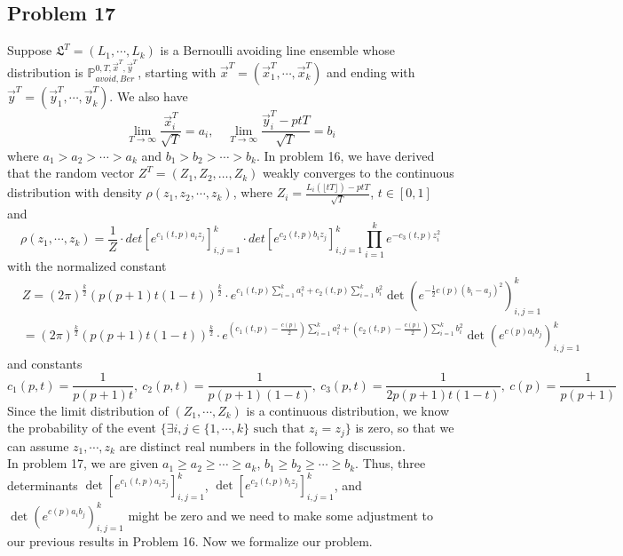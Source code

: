 \documentclass[12pt]{article}
\begin{document}
\subsection*{Problem 17}
Suppose $\mathfrak{L}^{T}=(L_{1},\cdots,L_{k})$ is a Bernoulli avoiding line ensemble whose distribution is $\mathbb{P}_{avoid, Ber}^{0,T,\vec{x}^{T},\vec{y}^{T}}$, starting with $\vec{x}^{T}=(\vec{x}^{T}_{1},\cdots,\vec{x}^{T}_{k})$ and ending with $\vec{y}^{T}=(\vec{y}^{T}_{1},\cdots,\vec{y}^{T}_{k})$. We also have $$\lim_{T\rightarrow\infty}\frac{\vec{x}_{i}^{T}}{\sqrt{T}}=a_{i}, \quad\lim_{T\rightarrow\infty}\frac{\vec{y}_{i}^{T}-ptT}{\sqrt{T}}=b_{i}$$ where $a_{1}>a_{2}>\cdots> a_{k}$ and $b_{1}>b_{2}>\cdots> b_{k}$. In problem 16, we have derived that the random vector $Z^{T}=(Z_{1},Z_{2},\dots,Z_{k})$ weakly converges to the continuous distribution with density $\rho(z_{1},z_{2},\cdots,z_{k})$, where $Z_{i}=\frac{L_{i}(\lfloor tT \rfloor)-ptT}{\sqrt{T}}$, $t\in[0,1]$ and 
$$\rho(z_{1},\cdots,z_{k})=\frac{1}{Z}\cdot det[e^{c_1(t,p)a_{i}z_{j}}]_{i,j=1}^{k}\cdot det[e^{c_2(t,p)b_{i}z_{j}}]_{i,j=1}^{k}\prod_{i=1}^{k}e^{-c_{3}(t,p)z_{i}^{2}}$$ with the normalized constant 
\begin{align*}
	&Z=(2\pi)^{\frac{k}{2}}(p(p+1)t(1-t))^{\frac{k}{2}}\cdot e^{c_{1}(t,p)\sum_{i=1}^{k}a_{i}^{2}+c_{2}(t,p)\sum_{i=1}^{k}b_{i}^{2}} \det(e^{-\frac{1}{2}c(p)(b_{i}-a_{j})^{2}})_{i,j=1}^{k}\\
	& =(2\pi)^{\frac{k}{2}}(p(p+1)t(1-t))^{\frac{k}{2}}\cdot e^{(c_{1}(t,p)-\frac{c(p)}{2})\sum_{i=1}^{k}a_{i}^{2}+(c_{2}(t,p)-\frac{c(p)}{2})\sum_{i=1}^{k}b_{i}^{2}}\det(e^{c(p)a_{i}b_{j}})_{i,j=1}^{k}
\end{align*}
and constants $$c_{1}(p,t)=\frac{1}{p(p+1)t},\ c_{2}(p,t)=\frac{1}{p(p+1)(1-t)},\ c_{3}(p,t)=\frac{1}{2p(p+1)t(1-t)},\ c(p)=\frac{1}{p(p+1)}$$
Since the limit distribution of $(Z_{1},\cdots,Z_{k})$ is a continuous distribution, we know the probability of the event $\{\exists i,j\in\{1,\cdots,k \}\text{ such that }z_{i}=z_{j}\}$ is zero, so that we can assume $z_{1},\cdots,z_{k}$ are distinct real numbers in the following discussion.\\
In problem 17, we are given $a_{1}\geqslant a_{2}\geqslant\cdots\geqslant a_{k}$, $b_{1}\geqslant b_{2}\geqslant\cdots\geqslant b_{k}$. Thus, three determinants $\det[e^{c_1(t,p)a_{i}z_{j}}]_{i,j=1}^{k}$, $\det[e^{c_2(t,p)b_{i}z_{j}}]_{i,j=1}^{k}$, and $\det(e^{c(p)a_{i}b_{j}})_{i,j=1}^{k}$ might be zero and we need to make some adjustment to our previous results in Problem 16. Now we formalize our problem.
\end{document}
